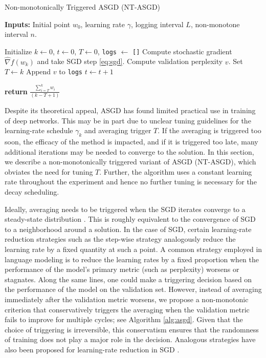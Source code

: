 \documentclass{article}
\begin{document}
\begin{algorithm}
\caption{Non-monotonically Triggered ASGD (NT-ASGD)}
\label{alg:asgd}
{\bf Inputs:} Initial point $w_0$, learning rate $\gamma$, logging interval $L$, non-monotone interval $n$.
\begin{algorithmic}[1]
\STATE Initialize $k\gets 0$, $t\gets 0$, $T \gets 0$, \texttt{logs} $\gets $ \texttt{[]}
\STATE Compute stochastic gradient $\hat{\nabla} f(w_k)$ and take SGD step \eqref{eq:sgd}.
\STATE Compute validation perplexity $v$.
\STATE Set $T \gets k$
\ENDIF
\STATE Append $v$ to \texttt{logs}
\STATE $t \gets t + 1$
\ENDIF
\ENDWHILE
\end{algorithmic}
{\bf return }  $\frac{\sum_{i=T}^k w_i}{(k-T+1)}$
\end{algorithm}



Despite its theoretical appeal, ASGD has found limited practical use in training of deep networks.
This may be in part due to unclear tuning guidelines for the learning-rate schedule $\gamma_k$ and averaging trigger $T$.
If the averaging is triggered too soon, the efficacy of the method is impacted, and if it is triggered too late, many additional iterations may be needed to converge to the solution.
In this section, we describe a non-monotonically triggered variant of ASGD (NT-ASGD), which obviates the need for tuning $T$. Further, the algorithm uses a constant learning rate throughout the experiment and hence no further tuning is necessary for the decay scheduling.

Ideally, averaging needs to be triggered when the SGD iterates converge to a steady-state distribution \cite{mandt2017stochastic}. This is roughly equivalent to the convergence of SGD to a neighborhood around a solution. In the case of SGD, certain learning-rate reduction strategies such as the step-wise strategy analogously reduce the learning rate by a fixed quantity at such a point. A common strategy employed in language modeling is to reduce the learning rates by a fixed proportion when the performance of the model's primary metric (such as perplexity) worsens or stagnates. Along the same lines, one could make a triggering decision based on the performance of the model on the validation set. However, instead of averaging immediately after the validation metric worsens, we propose a non-monotonic criterion that conservatively triggers the averaging when the validation metric fails to improve for multiple cycles; see Algorithm \ref{alg:asgd}. Given that the choice of triggering is irreversible, this conservatism ensures that the randomness of training does not play a major role in the decision. Analogous strategies have also been proposed for learning-rate reduction in SGD \cite{keskar2015nonmonotone}.
\end{document}
